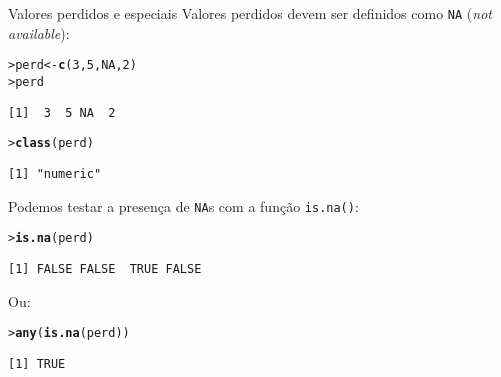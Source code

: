 \documentclass[10pt,handout]{beamer}\usepackage{graphicx, color}
\makeatletter
\newcommand{\hlfunctioncall}[1]{\textcolor[rgb]{0,0,0.545098039215686}{\textbf{#1}}}%
\newenvironment{kframe}{%
 \def\at@end@of@kframe{}%
 \ifinner\ifhmode%
  \def\at@end@of@kframe{\end{minipage}}%
  \begin{minipage}{\columnwidth}%
 \fi\fi%
 \def\FrameCommand##1{\hskip\@totalleftmargin \hskip-\fboxsep
 \colorbox{shadecolor}{##1}\hskip-\fboxsep
     \hskip-\linewidth \hskip-\@totalleftmargin \hskip\columnwidth}%
 \MakeFramed {\advance\hsize-\width
   \@totalleftmargin\z@ \linewidth\hsize
   \@setminipage}}%
 {\par\unskip\endMakeFramed%
 \at@end@of@kframe}
\newenvironment{knitrout}{}{} %
\makeatother
\begin{document}
\begin{frame}[fragile=singleslide]{Valores perdidos e especiais}
Valores perdidos devem ser definidos como \texttt{NA} (\textit{not available}):
\begin{knitrout}\small
{}\color{fgcolor}\begin{kframe}
\begin{alltt}
> perd <- \hlfunctioncall{c}(3, 5, NA, 2)
> perd
\end{alltt}
\begin{verbatim}
[1]  3  5 NA  2
\end{verbatim}
\begin{alltt}
> \hlfunctioncall{class}(perd)
\end{alltt}
\begin{verbatim}
[1] "numeric"
\end{verbatim}
\end{kframe}
\end{knitrout}

Podemos testar a presença de \texttt{NA}s com a função \texttt{is.na()}:
\begin{knitrout}\small
{}\color{fgcolor}\begin{kframe}
\begin{alltt}
> \hlfunctioncall{is.na}(perd)
\end{alltt}
\begin{verbatim}
[1] FALSE FALSE  TRUE FALSE
\end{verbatim}
\end{kframe}
\end{knitrout}

Ou:
\begin{knitrout}\small
{}\color{fgcolor}\begin{kframe}
\begin{alltt}
> \hlfunctioncall{any}(\hlfunctioncall{is.na}(perd))
\end{alltt}
\begin{verbatim}
[1] TRUE
\end{verbatim}
\end{kframe}
\end{knitrout}

\end{frame}
\end{document}
